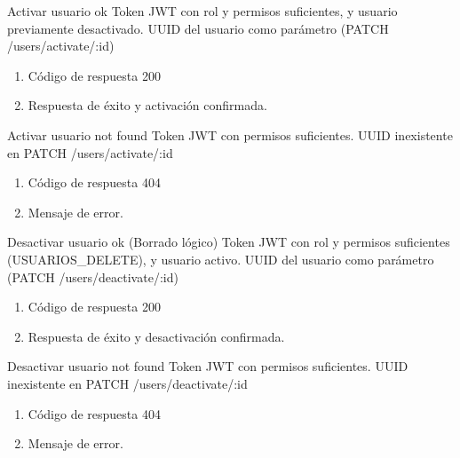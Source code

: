 {Activar usuario ok}
{Token JWT con rol y permisos suficientes, y usuario previamente desactivado.}
{UUID del usuario como parámetro (PATCH /users/activate/:id)}
{\begin{enumerate} [leftmargin=*, nosep]
    \item Código de respuesta 200
    \item Respuesta de éxito y activación confirmada.
\end{enumerate}}

{Activar usuario not found}
{Token JWT con permisos suficientes.}
{UUID inexistente en PATCH /users/activate/:id}
{\begin{enumerate} [leftmargin=*, nosep]
    \item Código de respuesta 404
    \item Mensaje de error.
\end{enumerate}}

{Desactivar usuario ok (Borrado lógico)}
{Token JWT con rol y permisos suficientes (USUARIOS\_DELETE), y usuario activo.}
{UUID del usuario como parámetro (PATCH /users/deactivate/:id)}
{\begin{enumerate} [leftmargin=*, nosep]
    \item Código de respuesta 200
    \item Respuesta de éxito y desactivación confirmada.
\end{enumerate}}

{Desactivar usuario not found}
{Token JWT con permisos suficientes.}
{UUID inexistente en PATCH /users/deactivate/:id}
{\begin{enumerate} [leftmargin=*, nosep]
    \item Código de respuesta 404
    \item Mensaje de error.
\end{enumerate}}

